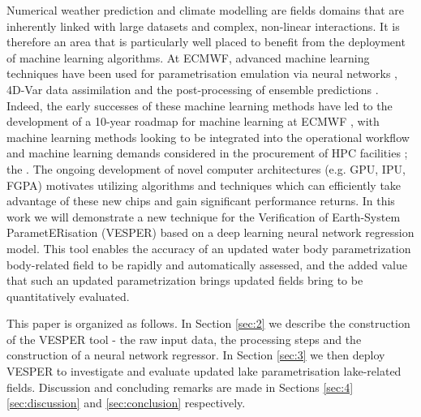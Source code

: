 \documentclass[hess, twostagejnl]{copernicus}
\providecommand{\DIFadd}[1]{{\protect\color{blue} \sf #1}} %
\providecommand{\DIFdel}[1]{{\protect\color{red} \scriptsize #1}} %
\providecommand{\DIFaddbegin}{} %
\providecommand{\DIFaddend}{} %
\providecommand{\DIFdelbegin}{} %
\providecommand{\DIFdelend}{} %
\begin{document}
\noindent Numerical weather prediction and climate modelling are \DIFdelbegin \DIFdel{fields }\DIFdelend \DIFaddbegin \DIFadd{domains }\DIFaddend that are inherently linked with large datasets and complex, non-linear interactions. It is therefore an area that is particularly well placed to benefit from the deployment of machine learning algorithms. At ECMWF, advanced machine learning techniques have been used for parametrisation emulation via neural networks \DIFdelbegin \DIFdel{\cite{Chantry2021}}\DIFdelend \DIFaddbegin \DIFadd{\citep{Chantry2021}}\DIFaddend , 4D-Var data assimilation \DIFdelbegin \DIFdel{\cite{Hatfield2021} }\DIFdelend \DIFaddbegin \DIFadd{\citep{Hatfield2021} }\DIFaddend and the post-processing of ensemble predictions \DIFdelbegin \DIFdel{\cite{Hewson2021}}\DIFdelend \DIFaddbegin \DIFadd{\citep{Hewson2021}}\DIFaddend . Indeed, the early successes of these machine learning methods have led to the development of a 10-year roadmap for machine learning at ECMWF \DIFdelbegin \DIFdel{\cite{p19877}}\DIFdelend \DIFaddbegin \DIFadd{\citep{p19877}}\DIFaddend , with machine learning methods looking to be integrated into the operational workflow and machine learning demands considered in the procurement of HPC facilities\DIFdelbegin \DIFdel{; the }\DIFdelend \DIFaddbegin \DIFadd{. The }\DIFaddend ongoing development of novel computer architectures (e.g. GPU, IPU, FGPA) motivates utilizing algorithms and techniques which can efficiently take advantage of these new chips and gain significant performance returns. In this work we will demonstrate a new technique for the Verification of Earth-System ParametERisation (VESPER) based on a deep learning neural network regression model. This tool enables the accuracy of an updated water \DIFdelbegin \DIFdel{body parametrization }\DIFdelend \DIFaddbegin \DIFadd{body-related field }\DIFaddend to be rapidly and automatically assessed, and the added value that such \DIFdelbegin \DIFdel{an updated parametrization brings }\DIFdelend \DIFaddbegin \DIFadd{updated fields bring }\DIFaddend to be quantitatively evaluated. \newline 


\noindent This paper is organized as follows. In Section \ref{sec:2} we describe the construction of the VESPER tool - the raw input data, the processing steps and the construction of a neural network regressor. In Section \ref{sec:3} we then deploy VESPER to investigate and evaluate updated \DIFdelbegin \DIFdel{lake parametrisation }\DIFdelend \DIFaddbegin \DIFadd{lake-related }\DIFaddend fields. Discussion and concluding remarks are made in Sections \DIFdelbegin \DIFdel{\ref{sec:4} }\DIFdelend \DIFaddbegin \DIFadd{\ref{sec:discussion} }\DIFaddend and \ref{sec:conclusion} respectively. 
\end{document}
